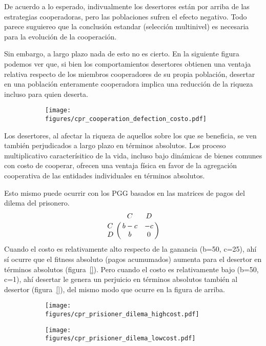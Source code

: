 \documentclass[a4paper,10pt]{article}
\begin{document}
De acuerdo a lo esperado, indivualmente los desertores están por arriba de las estrategias cooperadoras, pero las poblaciones sufren el efecto negativo.
Todo parece suguiereo que la conclusión estandar (selección multinivel) es necesaria para la evolución de la cooperación.


Sin embargo, a largo plazo nada de esto no es cierto.
En la siguiente figura podemos ver que, si bien los comportamientos desertores obtienen una ventaja relativa respecto de los miembros cooperadores de su propia población, desertar en una población enteramente cooperadora implica una reducción de la riqueza incluso para quien deserta.

\begin{figure}[H]
    \centering
    \begin{subfigure}[b]{0.45\textwidth}
    \texttt{[image: figures/cpr\_cooperation\_defection\_costo.pdf]}
    \end{subfigure}
    \caption{}
    \label{fig:cpr_cooperation_zoom}
\end{figure}

Los desertores, al afectar la riqueza de aquellos sobre los que se beneficia, se ven también perjudicados a largo plazo en términos absolutos.
Los proceso multiplicativo caracterísitico de la vida, incluso bajo dinámicas de bienes comunes con costo de cooperar, ofrecen una ventaja física en favor de la agregación cooperativa de las entidades individuales en términos absolutos.


Esto mismo puede ocurrir con los PGG basados en las matrices de pagos del dilema del prisonero.
\begin{equation}
    \bordermatrix{ & C & D \cr
      C & b-c & -c \cr
      D & b & 0  } 
\end{equation}
Cuando el costo es relativamente alto respecto de la ganancia (b=50, c=25), ahí sí ocurre que el fitness absoluto (pagos acumumados) aumenta para el desertor en términos absolutos (figura~\ref{}).
Pero cuando el costo es relativamente bajo (b=50, c=1), ahí desertar le genera un perjuicio en términos absolutos también al desertor (figura~\ref{}), del mismo modo que ocurre en la figura de arriba.

\begin{figure}[H]
    \centering
    \begin{subfigure}[b]{0.45\textwidth}
    \texttt{[image: figures/cpr\_prisioner\_dilema\_highcost.pdf]}
    \end{subfigure}
    \begin{subfigure}[b]{0.45\textwidth}
    \texttt{[image: figures/cpr\_prisioner\_dilema\_lowcost.pdf]}
    \end{subfigure}
    \caption{}
    \label{fig:cpr_cooperation_zoom}
\end{figure}
\end{document}
